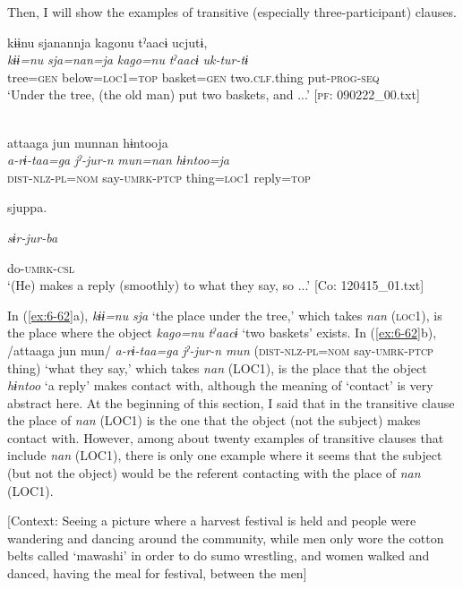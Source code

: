 \begin{table}
Then, I will show the examples of transitive (especially three-participant) clauses.

\ea\label{ex:6-62}
\ea {\TM}  kɨɨnu  sjanannja  kagonu  tˀaacɨ  ucjutɨ,\\
\glll \textit{kɨɨ=nu}  \textit{sja=nan=ja}  \textit{kago=nu}  \textit{tˀaacɨ}  \textit{uk-tur-tɨ}\\
tree=\textsc{gen}  below=\textsc{loc}1=\textsc{top}  basket=\textsc{gen}  two.\textsc{clf}.thing  put-\textsc{prog}-\textsc{seq}\\
\glt ‘Under the tree, (the old man) put two baskets, and ...’ [\textsc{pf}: 090222\_00.txt]
\z

\ex{}\\
{\TM}
\glll  attaaga  jun  munnan  hɨntooja\\
\textit{a-rɨ-taa=ga}  \textit{jˀ-jur-n}  \textit{mun=nan}  \textit{hɨntoo=ja}\\
\textsc{dist}-\textsc{nlz}-\textsc{pl}=\textsc{nom}  say-\textsc{umrk}-\textsc{ptcp}  thing=\textsc{loc}1  reply=\textsc{top}

      sjuppa.

      \textit{sɨr-jur-ba}

      do-\textsc{umrk}-\textsc{csl}\\
\glt ‘(He) makes a reply (smoothly) to what they say, so ...’ [Co: 120415\_01.txt]
\z

In (\ref{ex:6-62}a), \textit{kɨɨ=nu} \textit{sja} ‘the place under the tree,’ which takes \textit{nan} (\textsc{loc}1), is the place where the object \textit{kago=nu} \textit{tˀaacɨ} ‘two baskets’ exists. In (\ref{ex:6-62}b), /attaaga jun mun/ \textit{a-rɨ-taa=ga} \textit{jˀ-jur-n} \textit{mun} (\textsc{dist}-\textsc{nlz}-\textsc{pl}=\textsc{nom} say-\textsc{umrk}-\textsc{ptcp} thing) ‘what they say,’ which takes \textit{nan} (LOC1), is the place that the object \textit{hɨntoo} ‘a reply’ makes contact with, although the meaning of ‘contact’ is very abstract here. At the beginning of this section, I said that in the transitive clause the place of \textit{nan} (LOC1) is the one that the object (not the subject) makes contact with. However, among about twenty examples of transitive clauses that include \textit{nan} (LOC1), there is only one example where it seems that the subject (but not the object) would be the referent contacting with the place of \textit{nan} (LOC1).

\ea\label{ex:6-63}
 [Context: Seeing a picture where a harvest festival is held and people were wandering and dancing around the community, while men only wore the cotton belts called ‘mawashi’ in order to do sumo wrestling, and women walked and danced, having the meal for festival, between the men]\\


\end{table}
